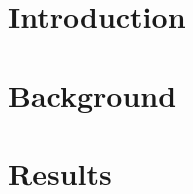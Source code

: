 


	
	\linenumbers
	\newpage
	\tableofcontents
	\newpage
	\section{Introduction}
	

	\section{Background}
	

	\section{Results}
	

	\newpage
	
	

